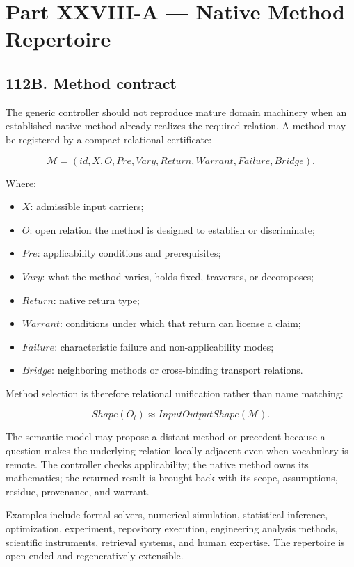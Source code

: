 \documentclass[
]{article}
\providecommand{\tightlist}{%
  \setlength{\itemsep}{0pt}\setlength{\parskip}{0pt}}
\begin{document}
\section{Part XXVIII-A --- Native Method
Repertoire}\label{part-xxviii-a-native-method-repertoire}

\subsection{112B. Method contract}\label{method-contract}

The generic controller should not reproduce mature domain machinery when an
established native method already realizes the required relation. A method may
be registered by a compact relational certificate:

\[
\boxed{
\mathcal M
=
(
id,
X,
O,
Pre,
Vary,
Return,
Warrant,
Failure,
Bridge
).
}
\]

Where:

\begin{itemize}
\tightlist
\item \(X\): admissible input carriers;
\item \(O\): open relation the method is designed to establish or discriminate;
\item \(Pre\): applicability conditions and prerequisites;
\item \(Vary\): what the method varies, holds fixed, traverses, or decomposes;
\item \(Return\): native return type;
\item \(Warrant\): conditions under which that return can license a claim;
\item \(Failure\): characteristic failure and non-applicability modes;
\item \(Bridge\): neighboring methods or cross-binding transport relations.
\end{itemize}

Method selection is therefore relational unification rather than name matching:

\[
\boxed{
Shape(O_t)
\approx
InputOutputShape(\mathcal M).
}
\]

The semantic model may propose a distant method or precedent because a question
makes the underlying relation locally adjacent even when vocabulary is remote.
The controller checks applicability; the native method owns its mathematics;
the returned result is brought back with its scope, assumptions, residue,
provenance, and warrant.

Examples include formal solvers, numerical simulation, statistical inference,
optimization, experiment, repository execution, engineering analysis methods,
scientific instruments, retrieval systems, and human expertise. The repertoire
is open-ended and regeneratively extensible.
\end{document}
